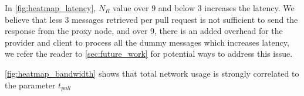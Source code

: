 \documentclass[a4paper,11pt,oneside]{report}
\begin{document}
In \autoref{fig:heatmap_latency}, \(N_R\) value over 9 and below 3 increases the latency. We believe that less 3 messages retrieved per pull request is not sufficient to send the response from the proxy node, and over 9, there is an added overhead for the provider and client to process all the dummy messages which increases latency, we refer the reader to \autoref{sec:future_work} for potential ways to address this issue.

\autoref{fig:heatmap_bandwidth} shows that total network usage is strongly correlated to the parameter \(t_{pull}\)








\end{document}
